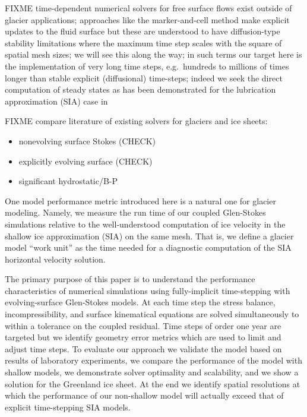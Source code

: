 \documentclass[letterpaper,final,12pt,reqno]{amsart}
\begin{document}
FIXME time-dependent numerical solvers for free surface flows exist outside of glacier applications; approaches like the marker-and-cell method \cite{HarlowWelch1965} make explicit updates to the fluid surface but these are understood to have diffusion-type stability limitations where the maximum time step scales with the square of spatial mesh sizes; we will see this along the way; in such terms our target here is the implementation of very long time steps, e.g.~hundreds to millions of times longer than stable explicit (diffusional) time-steps; indeed we seek the direct computation of steady states as has been demonstrated for the lubrication approximation (SIA) case in \cite{Bueler2016}

FIXME compare literature of existing solvers for glaciers and ice sheets:
\begin{itemize}
\item  nonevolving surface Stokes \cite{IsaacStadlerGhattas2015,Lengetal2013,Lengetal2014a,Zwingeretal2007} (CHECK)
\item  explicitly evolving surface \cite{Gudmundsson1999,HelanowAhlkrona2018,Jouvetetal2008,Larouretal2012,
Lengetal2014b,Lengetal2012,LeysingerGudmundsson2004,PralongFunk2004,Seddiketal2012} (CHECK)
\item significant hydrostatic/B-P \cite{BrownSmithAhmadia2013,Tuminaroetal2016}
\end{itemize}

One model performance metric introduced here is a natural one for glacier modeling.  Namely, we measure the run time of our coupled Glen-Stokes simulations relative to the well-understood computation of ice velocity in the shallow ice approximation (SIA) \cite{Fowler1997} on the same mesh.  That is, we define a glacier model ``work unit'' as the time needed for a diagnostic computation of the SIA horizontal velocity solution.

The primary purpose of this paper is to understand the performance characteristics of numerical simulations using fully-implicit time-stepping with evolving-surface Glen-Stokes models.  At each time step the stress balance, incompressibility, and surface kinematical equations are solved simultaneously to within a tolerance on the coupled residual.  Time steps of order one year are targeted but we identify geometry error metrics which are used to limit and adjust time steps.  To evaluate our approach we validate the model based on results of laboratory experiments, we compare the performance of the model with shallow models, we demonstrate solver optimality and scalability, and we show a solution for the Greenland ice sheet.  At the end we identify spatial resolutions at which the performance of our non-shallow model will actually exceed that of explicit time-stepping SIA models.
\end{document}
